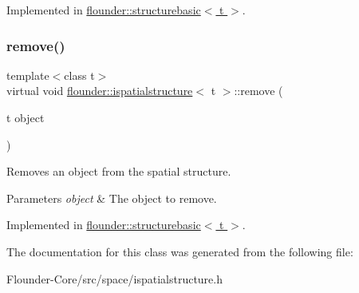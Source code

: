 Implemented in \hyperlink{classflounder_1_1structurebasic_a33f0b06e49ff40068e90f18773dff9e8}{flounder\+::structurebasic$<$ t $>$}.

\mbox{\label{classflounder_1_1ispatialstructure_afca84e244d4bf34d474f0c2456d493b1}} 
\subsubsection{\texorpdfstring{remove()}{remove()}}
{\footnotesize\ttfamily template$<$class t$>$ \\
virtual void \hyperlink{classflounder_1_1ispatialstructure}{flounder\+::ispatialstructure}$<$ t $>$\+::remove (\begin{DoxyParamCaption}\item[{t}]{object }\end{DoxyParamCaption})\hspace{0.3cm}{\ttfamily [pure virtual]}}



Removes an object from the spatial structure. 


\begin{DoxyParams}{Parameters}
{\em object} & The object to remove. \\
\hline
\end{DoxyParams}


Implemented in \hyperlink{classflounder_1_1structurebasic_a30ae1add25079e6bed1709b72d1d89e2}{flounder\+::structurebasic$<$ t $>$}.



The documentation for this class was generated from the following file\+:\begin{DoxyCompactItemize}
\item 
Flounder-\/\+Core/src/space/ispatialstructure.\+h\end{DoxyCompactItemize}
